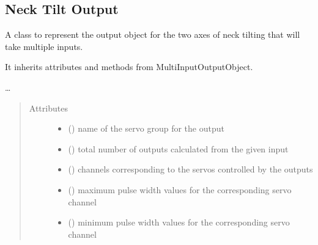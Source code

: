 \documentclass[letterpaper,10pt,english]{sphinxmanual}
\begin{document}
\subsection{Neck Tilt Output}
\label{\detokenize{specific:module-NeckTiltOutput}}\label{\detokenize{specific:neck-tilt-output}}

\begin{fulllineitems}
\label{\detokenize{specific:NeckTiltOutput.NeckTiltOutput}}
\sphinxAtStartPar
A class to represent the output object for the two axes of neck tilting 
that will take multiple inputs.

\sphinxAtStartPar
It inherits attributes and methods from MultiInputOutputObject.

\sphinxAtStartPar
…
\begin{quote}\begin{description}
\item[{Attributes}] \leavevmode\begin{itemize}
\item {} 
\sphinxAtStartPar
{}() \textendash{} name of the servo group for the output

\item {} 
\sphinxAtStartPar
{}() \textendash{} total number of outputs 
calculated from the given input

\item {} 
\sphinxAtStartPar
{}(\sphinxstyleemphasis{{[}int{]}}) \textendash{} channels corresponding to 
the servos controlled by the outputs

\item {} 
\sphinxAtStartPar
{}(\sphinxstyleemphasis{{[}int{]}}) \textendash{} maximum pulse width values 
for the corresponding servo channel

\item {} 
\sphinxAtStartPar
{}(\sphinxstyleemphasis{{[}int{]}}) \textendash{} minimum pulse width values 
for the corresponding servo channel


\end{itemize}
\end{description}
\end{quote}
\end{fulllineitems}
\end{document}
